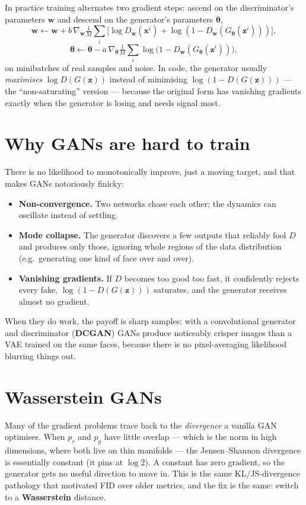 \documentclass[11pt, oneside]{book}
\newcommand{\grad}{\nabla}
\newcommand{\params}{\boldsymbol{\theta}}
\newcommand{\weights}{\mathbf{w}}
\newcommand{\xvec}{\mathbf{x}}
\newcommand{\zvec}{\mathbf{z}}
\begin{document}
In practice training alternates two gradient steps: ascend on the discriminator's
parameters $\weights$ and descend on the generator's parameters $\params$,
\[
  \weights \leftarrow \weights + b\,\grad_{\weights}\tfrac1M\textstyle\sum_i
    \bigl[\log D_{\weights}(\xvec^i) + \log(1 - D_{\weights}(G_{\params}(\zvec^i)))\bigr],
\]
\[
  \params \leftarrow \params - a\,\grad_{\params}\tfrac1M\textstyle\sum_i
    \log\bigl(1 - D_{\weights}(G_{\params}(\zvec^i))\bigr),
\]
on minibatches of real samples and noise. In code, the generator usually
\emph{maximises} $\log D(G(\zvec))$ instead of minimising $\log(1-D(G(\zvec)))$ ---
the ``non-saturating'' version --- because the original form has vanishing
gradients exactly when the generator is losing and needs signal most.

\section{Why GANs are hard to train}

There is no likelihood to monotonically improve, just a moving target, and that
makes GANs notoriously finicky:
\begin{itemize}
  \item \textbf{Non-convergence.} Two networks chase each other; the dynamics can
        oscillate instead of settling.
  \item \textbf{Mode collapse.} The generator discovers a few outputs that reliably
        fool $D$ and produces only those, ignoring whole regions of the data
        distribution (e.g.\ generating one kind of face over and over).
  \item \textbf{Vanishing gradients.} If $D$ becomes too good too fast, it
        confidently rejects every fake, $\log(1-D(G(\zvec)))$ saturates, and the
        generator receives almost no gradient.
\end{itemize}
When they do work, the payoff is sharp samples: with a convolutional generator and
discriminator (\textbf{DCGAN}) GANs produce noticeably crisper images than a VAE
trained on the same faces, because there is no pixel-averaging likelihood blurring
things out.

\section{Wasserstein GANs}

Many of the gradient problems trace back to the \emph{divergence} a vanilla GAN
optimises. When $p_r$ and $p_g$ have little overlap --- which is the norm in high
dimensions, where both live on thin manifolds --- the Jensen--Shannon divergence
is essentially constant (it pins at $\log 2$). A constant has zero gradient, so
the generator gets no useful direction to move in. This is the same
KL/JS-divergence pathology that motivated FID over older metrics, and the fix is
the same: switch to a \textbf{Wasserstein} distance.
\end{document}
